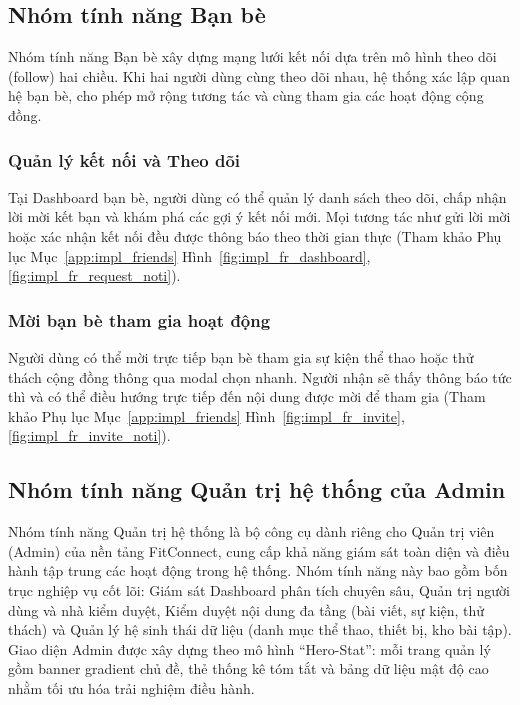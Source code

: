 \subsection{Nhóm tính năng Bạn bè}
\label{subsec:impl_friends}

Nhóm tính năng Bạn bè xây dựng mạng lưới kết nối dựa trên mô hình theo dõi (follow) hai chiều. Khi hai người dùng cùng theo dõi nhau, hệ thống xác lập quan hệ bạn bè, cho phép mở rộng tương tác và cùng tham gia các hoạt động cộng đồng.

\subsubsection{Quản lý kết nối và Theo dõi}
Tại Dashboard bạn bè, người dùng có thể quản lý danh sách theo dõi, chấp nhận lời mời kết bạn và khám phá các gợi ý kết nối mới. Mọi tương tác như gửi lời mời hoặc xác nhận kết nối đều được thông báo theo thời gian thực (Tham khảo Phụ lục Mục~\ref{app:impl_friends} Hình~\ref{fig:impl_fr_dashboard}, \ref{fig:impl_fr_request_noti}).

\subsubsection{Mời bạn bè tham gia hoạt động}
Người dùng có thể mời trực tiếp bạn bè tham gia sự kiện thể thao hoặc thử thách cộng đồng thông qua modal chọn nhanh. Người nhận sẽ thấy thông báo tức thì và có thể điều hướng trực tiếp đến nội dung được mời để tham gia (Tham khảo Phụ lục Mục~\ref{app:impl_friends} Hình~\ref{fig:impl_fr_invite}, \ref{fig:impl_fr_invite_noti}).

\subsection{Nhóm tính năng Quản trị hệ thống của Admin}
\label{subsec:impl_admin_system}

Nhóm tính năng Quản trị hệ thống là bộ công cụ dành riêng cho Quản trị viên (Admin) của nền tảng FitConnect, cung cấp khả năng giám sát toàn diện và điều hành tập trung các hoạt động trong hệ thống. Nhóm tính năng này bao gồm bốn trục nghiệp vụ cốt lõi: Giám sát Dashboard phân tích chuyên sâu, Quản trị người dùng và nhà kiểm duyệt, Kiểm duyệt nội dung đa tầng (bài viết, sự kiện, thử thách) và Quản lý hệ sinh thái dữ liệu (danh mục thể thao, thiết bị, kho bài tập). Giao diện Admin được xây dựng theo mô hình ``Hero-Stat'': mỗi trang quản lý gồm banner gradient chủ đề, thẻ thống kê tóm tắt và bảng dữ liệu mật độ cao nhằm tối ưu hóa trải nghiệm điều hành.


